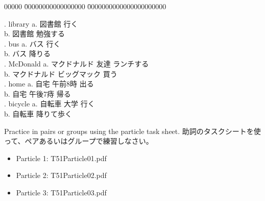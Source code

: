 \documentclass[uplatex,dvipdfmx,b5paper,english,10pt]{jsbook}
\begin{document}
\begin{tabbing}
00000 \= 00000000000000000 \= 0000000000000000000000 \kill

. library \>
a. 図書館\underline{\hspace{2em}} 行く   \\
\> \>
b. 図書館\underline{\hspace{2em}} 勉強する\\

. bus \>
a. バス \underline{\hspace{2em}} 行く   \\
\> \>
b. バス \underline{\hspace{2em}} 降りる \\

. McDonald \>
a. マクドナルド\underline{\hspace{2em}} 友達 \underline{\hspace{2em}} ランチする\\
\> \>
b. マクドナルド \underline{\hspace{2em}} ビッグマック \underline{\hspace{2em}} 買う \\

. home \>
a. 自宅 \underline{\hspace{2em}} 午前8時 \underline{\hspace{2em}} 出る\\
\> \>
b. 自宅 \underline{\hspace{2em}} 午後7痔 \underline{\hspace{2em}} 帰る\\

. bicycle \>
a. 自転車 \underline{\hspace{2em}} 大学 \underline{\hspace{2em}} 行く \\
\> \>
b. 自転車 \underline{\hspace{2em}} 降りて歩く \\

\end{tabbing}
\fi

\begin{toiquestion}
\ifEnglish
Practice in pairs or groups using the particle task sheet.
\else
助詞のタスクシートを使って、ペアあるいはグループで練習しなさい。
\fi
\begin{itemize}
  \item Particle 1: T51Particle01.pdf
  \item Particle 2: T51Particle02.pdf
  \item Particle 3: T51Particle03.pdf
\end{itemize}
\end{toiquestion}
\end{document}
